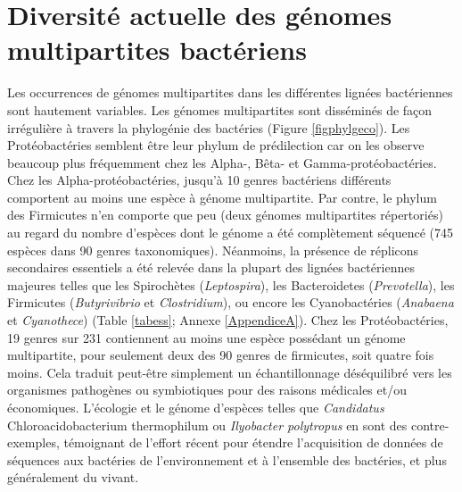 \section{Diversité actuelle des génomes multipartites bactériens}\label{diversite}
	Les occurrences de génomes multipartites dans les différentes lignées bactériennes sont hautement variables. Les génomes multipartites sont disséminés de façon irrégulière à travers la phylogénie des bactéries (Figure \ref{figphylgeco}). Les Protéobactéries semblent être leur phylum de prédilection car on les observe beaucoup plus fréquemment chez les Alpha-, Bêta- et Gamma-protéobactéries. Chez les Alpha-protéobactéries, jusqu'à 10 genres bactériens différents comportent au moins une espèce à génome multipartite. Par contre, le phylum des Firmicutes n'en comporte que peu  (deux génomes multipartites répertoriés) au regard du nombre d'espèces dont le génome a été complètement séquencé (745 espèces dans 90 genres taxonomiques). Néanmoins, la présence de réplicons secondaires essentiels a été relevée dans la plupart des lignées bactériennes majeures telles que les Spirochètes (\textit{Leptospira}), les Bacteroidetes (\textit{Prevotella}), les Firmicutes (\textit{Butyrivibrio} et \textit{Clostridium}), ou encore les Cyanobactéries (\textit{Anabaena} et \textit{Cyanothece}) (Table \ref{tabess}; Annexe \ref{AppendiceA}). Chez les Protéobactéries, 19 genres sur 231 contiennent au moins une espèce possédant un génome multipartite, pour seulement deux des 90 genres de firmicutes, soit quatre fois moins. Cela traduit peut-être simplement un échantillonnage déséquilibré vers les organismes pathogènes ou symbiotiques pour des raisons médicales et/ou économiques. L'écologie et le génome d'espèces telles que \textit{Candidatus} Chloroacidobacterium thermophilum \citep{GarciaCostas2012} ou \textit{Ilyobacter polytropus} \citep{Sikorski2010} en sont des contre-exemples, témoignant de l'effort récent pour étendre l'acquisition de données de séquences aux bactéries de l'environnement et à l'ensemble des bactéries, et plus généralement du vivant.  \\

